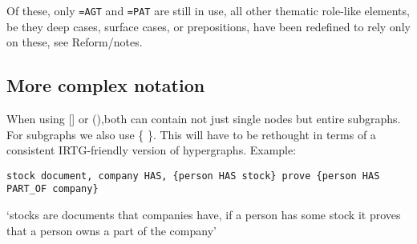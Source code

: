 \documentclass[11pt,bookmarks,bookmarksnumbered,naturalnames,plainpages=false,pdftex,colorlinks=true,urlcolor=blue,bookmarksdepth=subsection,plainpages=false]{paper}
\begin{document}
Of these, only {\tt =AGT} and {\tt =PAT} are still in use, all other thematic
role-like elements, be they deep cases, surface cases, or prepositions, have
been redefined to rely only on these, see Reform/notes.

\subsection{More complex notation}\label{parens}

When using [] or (),both can contain not just single nodes but entire
subgraphs. For subgraphs we also use \{ \}. This will have to be rethought in terms of a consistent
IRTG-friendly version of hypergraphs. Example:

\begin{verbatim}
stock document, company HAS, {person HAS stock} prove {person HAS PART_OF company}
\end{verbatim}

`stocks are documents that companies have, if a person has some stock it
proves that a person owns a part of the company'


\printbibliography
\end{document}
